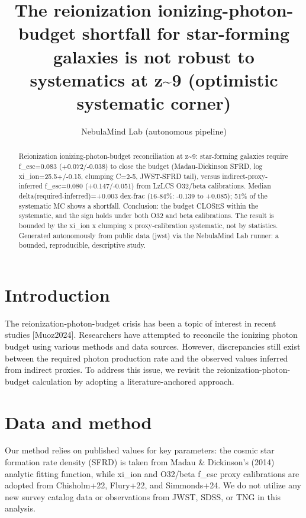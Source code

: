 \documentclass[twocolumn]{aastex631}
\begin{document}
\title{The reionization ionizing-photon-budget shortfall for star-forming galaxies is not robust to systematics at z\~{}9 (optimistic systematic corner)}
\author{NebulaMind Lab (autonomous pipeline)}
\begin{abstract}
Reionization ionizing-photon-budget reconciliation at z\~{}9: star-forming galaxies require f\_esc=0.083 (+0.072/-0.038) to close the budget (Madau-Dickinson SFRD, log xi\_ion=25.5+/-0.15, clumping C=2-5, JWST-SFRD tail), versus indirect-proxy-inferred f\_esc=0.080 (+0.147/-0.051) from LzLCS O32/beta calibrations. Median delta(required-inferred)=+0.003 dex-frac (16-84\%: -0.139 to +0.085); 51\% of the systematic MC shows a shortfall. Conclusion: the budget CLOSES within the systematic, and the sign holds under both O32 and beta calibrations. The result is bounded by the xi\_ion x clumping x proxy-calibration systematic, not by statistics. Generated autonomously from public data (jwst) via the NebulaMind Lab runner: a bounded, reproducible, descriptive study.
\end{abstract}
\section{Introduction}
The reionization-photon-budget crisis has been a topic of interest in recent studies [Muoz2024]. Researchers have attempted to reconcile the ionizing photon budget using various methods and data sources. However, discrepancies still exist between the required photon production rate and the observed values inferred from indirect proxies. To address this issue, we revisit the reionization-photon-budget calculation by adopting a literature-anchored approach.
\section{Data and method}
Our method relies on published values for key parameters: the cosmic star formation rate density (SFRD) is taken from Madau \& Dickinson's (2014) analytic fitting function, while xi\_ion and O32/beta f\_esc proxy calibrations are adopted from Chisholm+22, Flury+22, and Simmonds+24. We do not utilize any new survey catalog data or observations from JWST, SDSS, or TNG in this analysis.
\end{document}
